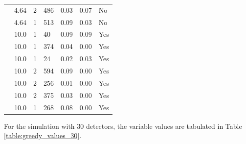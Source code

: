 \begin{longtable}{ | M{2.0cm} | M{2.0cm} | M{1.5cm} | M{1.5cm} | M{2.0cm} | M{2.0cm} | M{1.5cm} | }
                 & 4.64 & 2 & 486 & 0.03 & 0.07 & No \\
                 & 4.64 & 1 & 513 & 0.09 & 0.03 & No \\
                 & 10.0 & 1 & 40  & 0.09 & 0.09 & Yes \\
                 & 10.0 & 1 & 374 & 0.04 & 0.00 & Yes \\
                 & 10.0 & 1 & 24  & 0.02 & 0.03 & Yes \\
                 & 10.0 & 2 & 594 & 0.09 & 0.00 & Yes \\
                 & 10.0 & 2 & 256 & 0.01 & 0.00 & Yes \\
                 & 10.0 & 2 & 375 & 0.03 & 0.00 & Yes \\
                 & 10.0 & 1 & 268 & 0.08 & 0.00 & Yes \\
         \hline

\end{longtable}

For the simulation with 30 detectors, the variable values are tabulated in Table \ref{table:greedy_values_30}.

